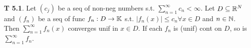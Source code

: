 {\bf T 5.1}. Let $(c_j)$ be a seq of non-neg numbers s.t. $\sum_{n=1}^{\infty} c_n < \infty$. Let $D \subseteq \mathbb{R}^N$ and $(f_n)$ be a seq of func $f_n: D\rightarrow \mathbb{K}$ s.t. $|f_n(x)| \leq c_n \forall x \in D$ and $n \in \mathbb{N}$. Then $\sum_{n=1}^{\infty}f_n(x)$ converges unif in $x \in D$. If each $f_n$ is (unif) cont on $D$, so is $\sum_{n=1}^{\infty}f_n$. 

